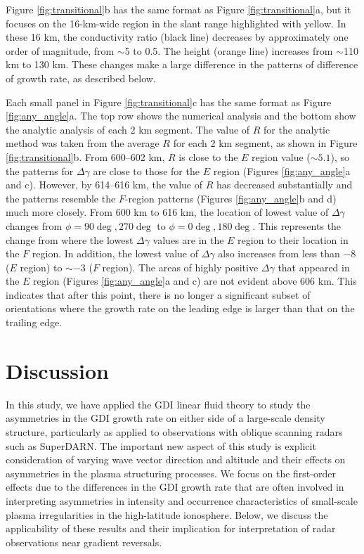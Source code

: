 Figure \ref{fig:transitional}b has the same format as Figure \ref{fig:transitional}a, but it focuses on the 16-km-wide region in the slant range highlighted with yellow. In these 16 km, the conductivity ratio (black line) decreases by approximately one order of magnitude, from \(\sim\)5 to 0.5. The height (orange line) increases from \(\sim\)110 km to 130 km. These changes make a large difference in the patterns of difference of growth rate, as described below.



Each small panel in Figure \ref{fig:transitional}c has the same format as Figure \ref{fig:any_angle}a. The top row shows the numerical analysis and the bottom show the analytic analysis of each 2 km segment.  The value of \(R\) for the analytic method was taken from the average \(R\) for each 2 km segment, as shown in Figure \ref{fig:transitional}b. From 600--602 km, \(R\) is close to the \(E\) region value (\(\sim5.1\)), so the patterns for \(\Delta\gamma\) are close to those for the \(E\) region (Figures \ref{fig:any_angle}a and c).  However, by 614--616 km, the value of \(R\) has decreased substantially and the patterns resemble the \(F\)-region patterns (Figures \ref{fig:any_angle}b and d) much more closely.  From 600 km to 616 km, the location of lowest value of \(\Delta\gamma\) changes from \(\phi=90\deg,270\deg\) to \(\phi=0\deg,180\deg\).  This represents the change from where the lowest \(\Delta\gamma\) values are in the \(E\) region to their location in the \(F\) region. In addition, the lowest value of \(\Delta\gamma\) also increases from less than \(-8\) (\(E\) region) to \(\sim-3\) (\(F\) region).  The areas of highly positive \(\Delta\gamma\) that appeared in the \(E\) region (Figures \ref{fig:any_angle}a and c) are not evident above 606 km. This indicates that after this point, there is no longer a significant subset of orientations where the growth rate on the leading edge is larger than that on the trailing edge.



\section{Discussion}
\label{sec:p2discussion}
In this study, we have applied the GDI linear fluid theory to study the asymmetries in the GDI growth rate on either side of a large-scale density structure, particularly as applied to observations with oblique scanning radars such as SuperDARN.  The important new aspect of this study is explicit consideration of varying wave vector direction and altitude and their effects on asymmetries in the plasma structuring processes. We focus on the first-order effects due to the differences in the GDI growth rate that are often involved in interpreting asymmetries in intensity and occurrence characteristics of  small-scale plasma irregularities in the high-latitude ionosphere.  Below, we discuss the applicability of these results and their implication for interpretation of radar observations near gradient reversals.

